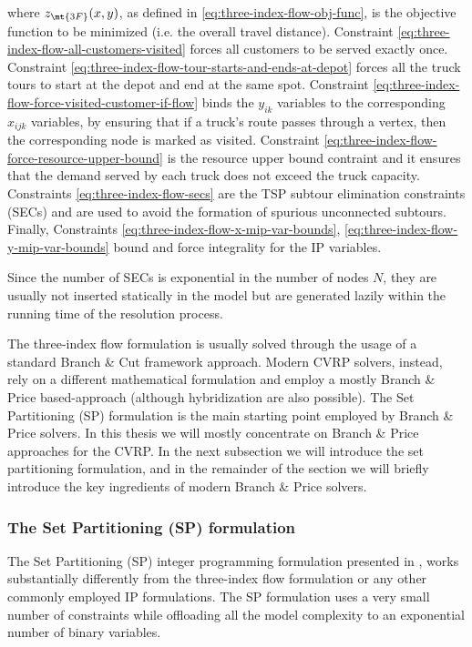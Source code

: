 where $z_\mt{3F}(x, y)$, as defined in \eqref{eq:three-index-flow-obj-func}, is the objective function to be minimized (i.e. the overall travel distance).
Constraint \eqref{eq:three-index-flow-all-customers-visited} forces all customers to be served exactly once.
Constraint \eqref{eq:three-index-flow-tour-starts-and-ends-at-depot} forces all the truck tours to start at the depot and end at the same spot.
Constraint \eqref{eq:three-index-flow-force-visited-customer-if-flow} binds the $y_{ik}$ variables to the corresponding $x_{ijk}$ variables, by ensuring that if a truck's route passes through a vertex, then the corresponding node is marked as visited.
Constraint \eqref{eq:three-index-flow-force-resource-upper-bound} is the resource upper bound contraint and it ensures that the demand served by each truck does not exceed the truck capacity.
Constraints \eqref{eq:three-index-flow-secs} are the TSP subtour elimination constraints (SECs) and are used to avoid the formation of spurious unconnected subtours.
Finally, Constraints \eqref{eq:three-index-flow-x-mip-var-bounds}, \eqref{eq:three-index-flow-y-mip-var-bounds} bound and force integrality for the IP variables.

Since the number of SECs is exponential in the number of nodes $N$, they are usually not inserted statically in the model but are generated lazily within the running time of the resolution process.

The three-index flow formulation is usually solved through the usage of a standard Branch \& Cut framework approach.
Modern CVRP solvers, instead, rely on a different mathematical formulation and employ a  mostly Branch \& Price based-approach (although hybridization are also possible).
The Set Partitioning (SP) formulation is the main starting point employed by Branch \& Price solvers.
In this thesis we will mostly concentrate on Branch \& Price approaches for the CVRP.
In the next subsection we will introduce the set partitioning formulation, and in the remainder of the section
we will briefly introduce the key ingredients of modern Branch \& Price solvers.

\subsubsection{The Set Partitioning (SP) formulation}
\label{sec:intro-set-partition-formulation}

The Set Partitioning (SP) integer programming formulation presented in \textcite{balinski1964integer},
works substantially differently from the three-index flow formulation or any other commonly employed IP formulations.
The SP formulation uses a very small number of constraints while offloading all the model complexity to an exponential number of binary variables.

